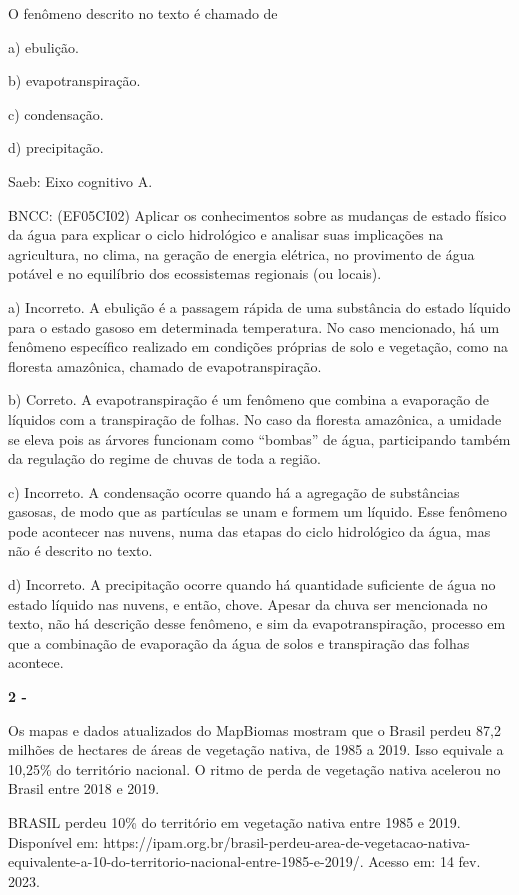 O fenômeno descrito no texto é chamado de

a) ebulição.

b) evapotranspiração.

c) condensação.

d) precipitação.

Saeb: Eixo cognitivo A.

BNCC: (EF05CI02) Aplicar os conhecimentos sobre as mudanças de estado
físico da água para explicar o ciclo hidrológico e analisar suas
implicações na agricultura, no clima, na geração de energia elétrica, no
provimento de água potável e no equilíbrio dos ecossistemas regionais
(ou locais).

a) Incorreto. A ebulição é a passagem rápida de uma substância do estado
líquido para o estado gasoso em determinada temperatura. No caso
mencionado, há um fenômeno específico realizado em condições próprias de
solo e vegetação, como na floresta amazônica, chamado de
evapotranspiração.

b) Correto. A evapotranspiração é um fenômeno que combina a evaporação
de líquidos com a transpiração de folhas. No caso da floresta amazônica,
a umidade se eleva pois as árvores funcionam como ``bombas'' de água,
participando também da regulação do regime de chuvas de toda a região.

c) Incorreto. A condensação ocorre quando há a agregação de substâncias
gasosas, de modo que as partículas se unam e formem um líquido. Esse
fenômeno pode acontecer nas nuvens, numa das etapas do ciclo hidrológico
da água, mas não é descrito no texto.

d) Incorreto. A precipitação ocorre quando há quantidade suficiente de
água no estado líquido nas nuvens, e então, chove. Apesar da chuva ser
mencionada no texto, não há descrição desse fenômeno, e sim da
evapotranspiração, processo em que a combinação de evaporação da água de
solos e transpiração das folhas acontece.

\textbf{2 - }

Os mapas e dados atualizados do MapBiomas mostram que o Brasil perdeu
87,2 milhões de hectares de áreas de vegetação nativa, de 1985 a 2019.
Isso equivale a 10,25\% do território nacional. O ritmo de perda de
vegetação nativa acelerou no Brasil entre 2018 e 2019.

BRASIL perdeu 10\% do território em vegetação nativa entre 1985 e 2019.
Disponível em:
https://ipam.org.br/brasil-perdeu-area-de-vegetacao-nativa-equivalente-a-10-do-territorio-nacional-entre-1985-e-2019/.
Acesso em: 14 fev. 2023.

